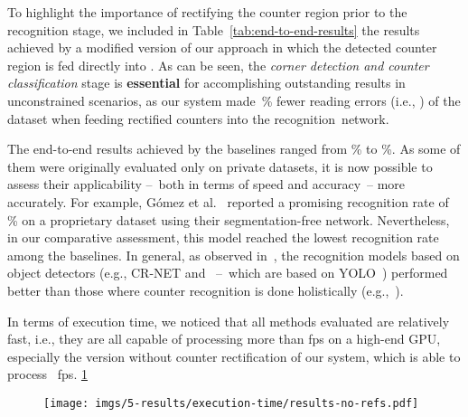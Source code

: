 To highlight the importance of rectifying the counter region prior to the recognition stage, we included in Table~\ref{tab:end-to-end-results} the results achieved by a modified version of our approach in which the detected counter region is fed directly into \ocrnet {}.
As can be seen, the \textit{corner detection and counter classification} stage is \textbf{essential} for accomplishing outstanding results in unconstrained scenarios, as our system made~\% fewer reading errors  (i.e., )  of the \dataset dataset when feeding rectified counters into the recognition~network.



The end-to-end results achieved by the baselines ranged from \% to \%.
As some of them were originally evaluated only on private datasets, it is now possible to assess their applicability --~both in terms of speed and accuracy~-- more accurately.
For example, Gómez et al.~\cite{gomez2018cutting} reported a promising recognition rate of \% on a proprietary dataset using their segmentation-free network.
Nevertheless, in our comparative assessment, this model reached the lowest recognition rate among the baselines.
In general, as observed in~\cite{laroca2019convolutional}, the recognition models  based on object detectors (e.g., CR-NET and \ocrnet~--~which are based on YOLO~\cite{redmon2016yolo}) performed better than those where counter recognition is done holistically (e.g.,~\cite{shi2017endtoend,gomez2018cutting,baek2019what,calefati2019reading}).

In terms of execution time, we noticed that all methods evaluated are relatively fast, i.e., they are all capable of processing more than  \gls*{fps} on a high-end GPU, especially the version without counter rectification of our system, which is able to process ~\gls*{fps}.
\ref{fig:performance-graph}

\begin{figure}[!htb]
    \centering
    \texttt{[image: imgs/5-results/execution-time/results-no-refs.pdf]}
    
    \vspace{-3mm}
    
    \caption{\small {}}
    \label{fig:performance-graph}
\end{figure}


